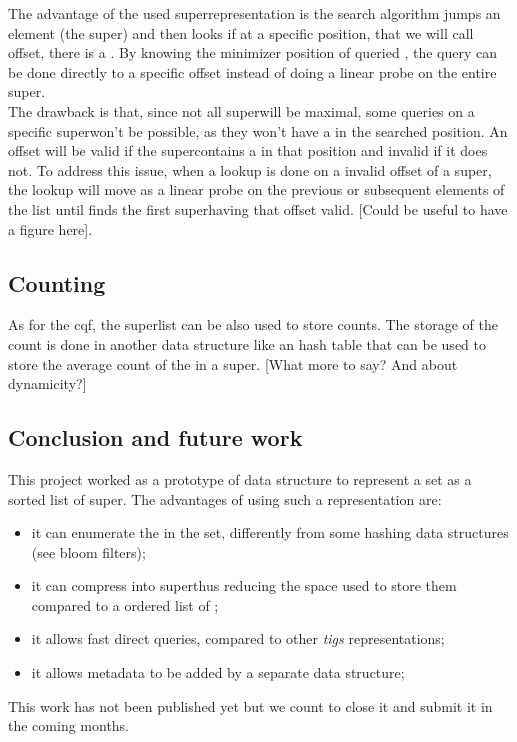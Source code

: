 The advantage of the used super\kmer representation is the search algorithm jumps an element (the super\kmer) and then looks if at a specific position, that we will call offset, there is a \kmer. By knowing the minimizer position of queried \kmer, the query can be done directly to a specific offset instead of doing a linear probe on the entire super\kmer.\\
The drawback is that, since not all super\kmers will be maximal, some queries on a specific super\kmer won't be possible, as they won't have a \kmer in the searched position. An offset will be valid if the super\kmer contains a \kmer in that position and invalid if it does not. To address this issue, when a lookup is done on a invalid offset of a super\kmer, the lookup will move as a linear probe on the previous or subsequent elements of the list until finds the first super\kmer having that offset valid.
[Could be useful to have a figure here].

\subsection{Counting \kmers}
As for the cqf, the super\kmer list can be also used to store \kmer counts. The storage of the count is done in another data structure like an hash table that can be used to store the average count of the \kmers in a super\kmer.
[What more to say? And about dynamicity?]

\subsection{Conclusion and future work}
This project worked as a prototype of data structure to represent a \kmer set as a sorted list of super\kmers. The advantages of using such a representation are:
\begin{itemize}
	\item it can enumerate the \kmers in the set, differently from some hashing data structures (see bloom filters);
	\item it can compress \kmers into super\kmers thus reducing the space used to store them compared to a ordered list of \kmers;
	\item it allows fast direct queries, compared to other \emph{tigs} representations;
	\item it allows metadata to be added by a separate data structure;
\end{itemize}
This work has not been published yet but we count to close it and submit it in the coming months.

